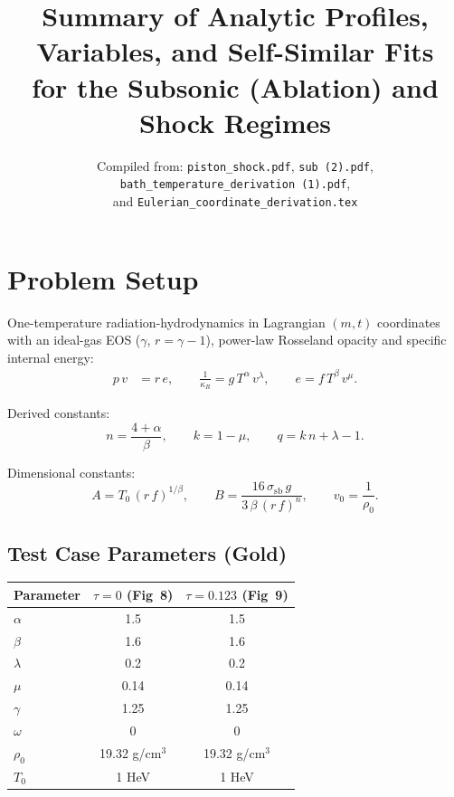 \documentclass[11pt]{article}
\title{Summary of Analytic Profiles, Variables, and Self-Similar Fits \\
for the Subsonic (Ablation) and Shock Regimes}
\author{Compiled from: \texttt{piston\_shock.pdf}, \texttt{sub\,(2).pdf},\\
\texttt{bath\_temperature\_derivation\,(1).pdf},\\
and \texttt{Eulerian\_coordinate\_derivation.tex}}
\date{}
\begin{document}
\maketitle
\tableofcontents
\newpage

\section{Problem Setup}
\label{sec:setup}

One-temperature radiation-hydrodynamics in Lagrangian $(m,t)$ coordinates with an ideal-gas EOS ($\gamma$, $r = \gamma - 1$), power-law Rosseland opacity and specific internal energy:
\begin{align}
  p\,v &= r\,e, \qquad
  \frac{1}{\kappa_R} = g\,T^{\alpha}\,v^{\lambda}, \qquad
  e = f\,T^{\beta}\,v^{\mu}.
\end{align}

Derived constants:
\begin{equation}
  n = \frac{4+\alpha}{\beta}, \qquad
  k = 1 - \mu, \qquad
  q = k\,n + \lambda - 1.
\end{equation}

Dimensional constants:
\begin{equation}
  A = T_0\,(r\,f)^{1/\beta}, \qquad
  B = \frac{16\,\sigma_{\mathrm{sb}}\,g}{3\,\beta\,(r\,f)^{n}}, \qquad
  v_0 = \frac{1}{\rho_0}.
\end{equation}

\subsection{Test Case Parameters (Gold)}

\begin{center}
\begin{tabular}{lcc}
\toprule
Parameter & $\tau=0$ (Fig~8) & $\tau=0.123$ (Fig~9) \\
\midrule
$\alpha$ & 1.5 & 1.5 \\
$\beta$ & 1.6 & 1.6 \\
$\lambda$ & 0.2 & 0.2 \\
$\mu$ & 0.14 & 0.14 \\
$\gamma$ & 1.25 & 1.25 \\
$\omega$ & 0 & 0 \\
$\rho_0$ & 19.32 g/cm$^3$ & 19.32 g/cm$^3$ \\
$T_0$ & 1 HeV & 1 HeV \\
\bottomrule
\end{tabular}
\end{center}
\end{document}
